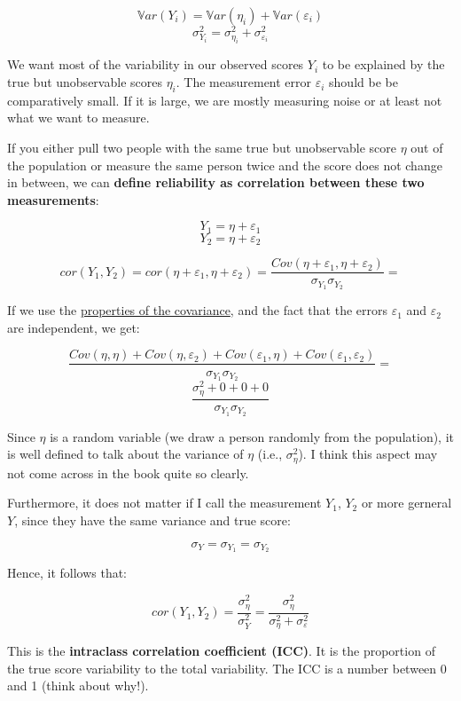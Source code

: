 \documentclass[
]{book}
\begin{document}
\[ \mathbb{V}ar(Y_i) = \mathbb{V}ar(\eta_i) + \mathbb{V}ar(\varepsilon_i) \]
\[ \sigma_{Y_i}^2 = \sigma_{\eta_i}^2 + \sigma_{\varepsilon_i}^2 \]

We want most of the variability in our observed scores \(Y_i\) to be explained by the
true but unobservable scores \(\eta_i\). The measurement error \(\varepsilon_i\) should be
be comparatively small. If it is large, we are mostly measuring noise or at least not
what we want to measure.

If you either pull two people with the same true but unobservable score \(\eta\) out of the population
or measure the same person twice and the score does not change in between, we can
\textbf{define reliability as correlation between these two measurements}:

\[Y_1 = \eta + \varepsilon_1\]
\[Y_2 = \eta + \varepsilon_2\]

\[cor(Y_1, Y_2) = cor(\eta + \varepsilon_1, \eta + \varepsilon_2) = 
\frac{Cov(\eta + \varepsilon_1, \eta + \varepsilon_2)}{\sigma_{Y_1}\sigma_{Y_2}}  = \]

If we use the \href{https://en.wikipedia.org/wiki/Covariance\#Properties}{properties of the covariance},
and the fact that the errors \(\varepsilon_1\) and \(\varepsilon_2\) are independent, we get:

\[ \frac{Cov(\eta, \eta) + Cov(\eta, \varepsilon_2) + Cov(\varepsilon_1, \eta) + Cov(\varepsilon_1, \varepsilon_2)}{\sigma_{Y_1} \sigma_{Y_2}}  = \]
\[ \frac{\sigma_{\eta}^2 + 0 + 0 + 0}{\sigma_{Y_1} \sigma_{Y_2}}\]

Since \(\eta\) is a random variable (we draw a person randomly from the population),
it is well defined to talk about the variance of \(\eta\) (i.e., \(\sigma_{\eta}^2\)).
I think this aspect may not come across in the book quite so clearly.

Furthermore, it does not matter if I call the measurement \(Y_1\), \(Y_2\) or more gerneral
\(Y\), since they have the same variance and true score:

\[\sigma_{Y} = \sigma_{Y_1} = \sigma_{Y_2}\]

Hence, it follows that:

\[cor(Y_1, Y_2) =  \frac{\sigma_{\eta}^2}{\sigma_{Y}^2} = \frac{\sigma_{\eta}^2}{\sigma_{\eta}^2 + \sigma_{\varepsilon}^2}\]

This is the \textbf{intraclass correlation coefficient (ICC)}. It is the proportion of the
true score variability to the total variability. The ICC is a number between 0 and 1 (think about why!).
\end{document}
